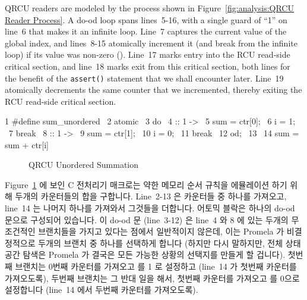 QRCU readers are modeled by the  process shown in
Figure~\ref{fig:analysis:QRCU Reader Process}.
A do-od loop spans lines~5-16, with a single guard of ``1''
on line~6 that makes it an infinite loop.
Line~7 captures the current value of the global index, and lines~8-15
atomically increment it (and break from the infinite loop)
if its value was non-zero ().
Line~17 marks entry into the RCU read-side critical section, and
line~18 marks exit from this critical section, both lines for the benefit of
the {\tt assert()} statement that we shall encounter later.
Line~19 atomically decrements the same counter that we incremented,
thereby exiting the RCU read-side critical section.
\fi

{ \scriptsize
\begin{verbbox}
  1 #define sum_unordered \
  2   atomic { \
  3     do \
  4     :: 1 -> \
  5       sum = ctr[0]; \
  6       i = 1; \
  7       break \
  8     :: 1 -> \
  9       sum = ctr[1]; \
 10       i = 0; \
 11       break \
 12     od; \
 13   } \
 14   sum = sum + ctr[i]
\end{verbbox}
}
\begin{figure}[htbp]
\centering
\theverbbox
\caption{QRCU Unordered Summation}
\label{fig:analysis:QRCU Unordered Summation}
\end{figure}

Figure~\ref{fig:analysis:QRCU Unordered Summation}
에 보인 C 전처리기 매크로는 약한 메모리 순서 규칙을 에뮬레이션 하기 위해 두개의
카운터들의 합을 구합니다.
Line~2-13 은 카운터들 중 하나를 가져오고, line~14 는 나머지 하나를 가져와서
그것들을 더합니다.
어토믹 블락은 하나의 do-od 문으로 구성되어 있습니다.
이 do-od 문 (line~3-12) 은 line~4 와 8 에 있는 두개의 무조건적인 브랜치들을
가지고 있다는 점에서 일반적이지 않은데, 이는 Promela 가 비결정적으로 두개의
브랜치 중 하나를 선택하게 합니다 (하지만 다시 말하지만, 전체 상태 공간 탐색은
Promela 가 결국은 모든 가능한 상황의 선택지를 만들게 할 겁니다).
첫번째 브랜치는 0번째 카운터를 가져오고  를 1 로 설정하고 (line~14 가
첫번째 카운터를 가져오도록), 두번째 브랜치는 그 반대 일을 해서, 첫번째 카운터를
가져오고 \co{i} 를 0으로 설정합니다 (line~14 에서 두번째 카운터를 가져오도록).
\iffalse

The C-preprocessor macro shown in
Figure~\ref{fig:analysis:QRCU Unordered Summation}
sums the pair of counters so as to emulate weak memory ordering.
Lines~2-13 fetch one of the counters, and line~14 fetches the other
of the pair and sums them.
The atomic block consists of a single do-od statement.
This do-od statement (spanning lines~3-12) is unusual in that
it contains two unconditional
branches with guards on lines~4 and~8, which causes Promela to
non-deterministically choose one of the two (but again, the full
state-space search causes Promela to eventually make all possible
choices in each applicable situation).
The first branch fetches the zero-th counter and sets \co{i} to 1 (so
that line~14 will fetch the first counter), while the second
branch does the opposite, fetching the first counter and setting \co{i}
to 0 (so that line~14 will fetch the second counter).
\fi

